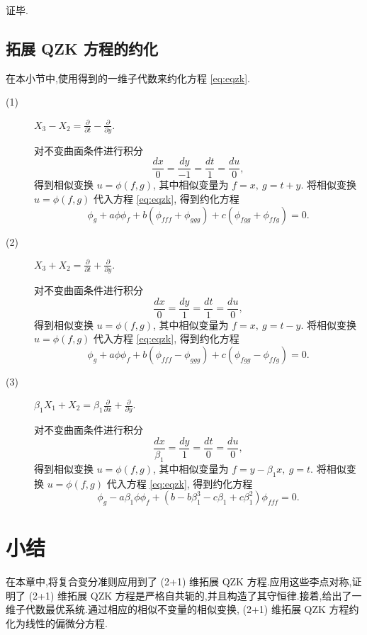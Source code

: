 证毕.

\subsection{拓展 QZK 方程的约化}\label{sec:05reduction}
在本小节中,使用得到的一维子代数来约化方程 \eqref{eq:eqzk}.
\begin{description}

\item[(1)] $X_3-X_2=\frac{\partial}{\partial t}-\frac{\partial}{\partial y}.$

对不变曲面条件进行积分
\begin{equation*}
	\frac{dx}{0}=\frac{dy}{-1}=\frac{dt}{1}=\frac{du}{0},
\end{equation*}
得到相似变换 $u=\phi(f,g)$, 其中相似变量为 $f=x,~g=t+y$.
将相似变换 $u=\phi(f,g)$ 代入方程 \eqref{eq:eqzk}, 得到约化方程
\begin{equation*}
	\phi_g+a\phi \phi_f+b(\phi_{fff}+\phi_{ggg})+c(\phi_{fgg}+\phi_{ffg})=0.
\end{equation*}

\item[(2)]$X_3+X_2=\frac{\partial}{\partial t}+\frac{\partial}{\partial y}.$

对不变曲面条件进行积分
\begin{equation*}
	\frac{dx}{0}=\frac{dy}{1}=\frac{dt}{1}=\frac{du}{0},
\end{equation*}
得到相似变换 $u=\phi(f,g)$, 其中相似变量为 $f=x,~g=t-y$.
将相似变换 $u=\phi(f,g)$ 代入方程 \eqref{eq:eqzk}, 得到约化方程
\begin{equation*}
	\phi_g+a\phi \phi_f+b(\phi_{fff}-\phi_{ggg})+c(\phi_{fgg}-\phi_{ffg})=0.
\end{equation*}

\item[(3)]$\beta_1X_1+X_2=\beta_1\frac{\partial}{\partial x}+\frac{\partial}{\partial y}.$

对不变曲面条件进行积分
\begin{equation*}
	\frac{dx}{\beta_1}=\frac{dy}{1}=\frac{dt}{0}=\frac{du}{0},
\end{equation*}
得到相似变换 $u=\phi(f,g)$, 其中相似变量为 $f=y-\beta_1x,~g=t$.
将相似变换 $u=\phi(f,g)$ 代入方程 \eqref{eq:eqzk}, 得到约化方程
\begin{equation*}
	\phi_g-a\beta_1\phi \phi_f+(b-b\beta_1^3-c\beta_1+c\beta_1^2)\phi_{fff}=0.
\end{equation*}
\end{description}


\section{小结}\label{sec:05conclusion}
在本章中,将复合变分准则应用到了 (2+1) 维拓展 QZK 方程.应用这些李点对称,证明了 (2+1) 维拓展 QZK 方程是严格自共轭的,并且构造了其守恒律.接着,给出了一维子代数最优系统.通过相应的相似不变量的相似变换, (2+1) 维拓展 QZK 方程约化为线性的偏微分方程.
